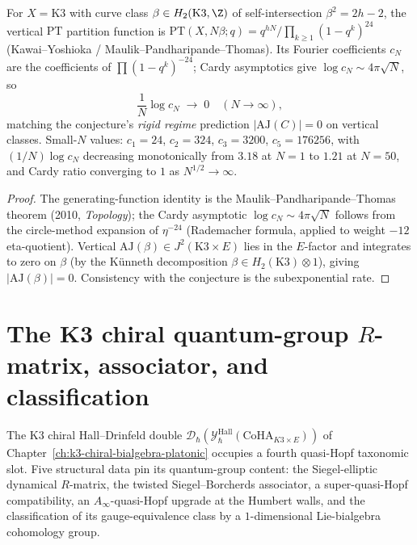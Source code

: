 \begin{proposition}
\label{prop:chiral-volume-rigid-vertical}
For $X = \mathrm{K3}$ with curve class $\beta \in H_2(\mathrm{K3}, \Z)$ of self-intersection $\beta^2 = 2h - 2$, the vertical $\mathrm{PT}$ partition function is $\mathrm{PT}(X, N\beta; q) = q^{hN}/\prod_{k \geq 1} (1 - q^k)^{24}$ (Kawai--Yoshioka / Maulik--Pandharipande--Thomas). Its Fourier coefficients $c_N$ are the coefficients of $\prod(1-q^k)^{-24}$; Cardy asymptotics give $\log c_N \sim 4\pi \sqrt{N}$, so
\[
 \frac{1}{N} \log c_N \;\to\; 0 \quad (N \to \infty),
\]
matching the conjecture's \emph{rigid regime} prediction $|\mathrm{AJ}(C)| = 0$ on vertical classes. Small-$N$ values: $c_1 = 24$, $c_2 = 324$, $c_3 = 3200$, $c_5 = 176256$, with $(1/N)\log c_N$ decreasing monotonically from $3.18$ at $N = 1$ to $1.21$ at $N = 50$, and Cardy ratio converging to $1$ as $N^{1/2} \to \infty$.
\end{proposition}

\begin{proof}
The generating-function identity is the Maulik--Pandharipande--Thomas theorem (2010, \emph{Topology}); the Cardy asymptotic $\log c_N \sim 4\pi\sqrt{N}$ follows from the circle-method expansion of $\eta^{-24}$ (Rademacher formula, applied to weight $-12$ eta-quotient). Vertical $\mathrm{AJ}(\beta) \in J^2(\mathrm{K3} \times E)$ lies in the $E$-factor and integrates to zero on $\beta$ (by the K\"unneth decomposition $\beta \in H_2(\mathrm{K3}) \otimes 1$), giving $|\mathrm{AJ}(\beta)| = 0$. Consistency with the conjecture is the subexponential rate.
\end{proof}

\section{The K3 chiral quantum-group \texorpdfstring{$R$}{R}-matrix, associator, and classification}
\label{sec:qca-k3-chiral-quantum-group}

The K3 chiral Hall--Drinfeld double
$\mathcal{D}_\hbar(\mathcal{Y}^{\mathrm{Hall}}_\hbar(\mathrm{CoHA}_{K3\times E}))$
of Chapter~\ref{ch:k3-chiral-bialgebra-platonic} occupies a fourth quasi-Hopf
taxonomic slot. Five structural data pin its quantum-group content:
the Siegel-elliptic dynamical $R$-matrix,
the twisted Siegel--Borcherds associator,
a super-quasi-Hopf compatibility,
an $A_\infty$-quasi-Hopf upgrade at the Humbert walls,
and the classification of its gauge-equivalence class by a $1$-dimensional
Lie-bialgebra cohomology group.

